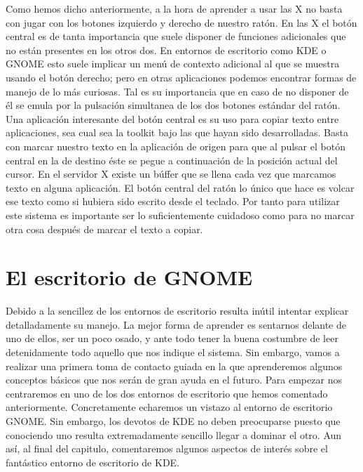 Como hemos dicho anteriormente, a la  hora de aprender a usar las {\sf
X} no basta  con jugar con los botones izquierdo  y derecho de nuestro
ratón. En  las {\sf X}  el botón central  es de tanta  importancia que
suele disponer de funciones adicionales  que no están presentes en los
otros dos. En entornos de escritorio como {\sf KDE} o {\sf GNOME} esto
suele implicar un menú de contexto  adicional al que se muestra usando
el botón derecho; pero en  otras aplicaciones podemos encontrar formas
de manejo de lo más curiosas. Tal  es su importancia que en caso de no
disponer de él se emula por la pulsación simultanea de los dos botones
estándar del ratón. Una aplicación interesante del botón central es su
uso para copiar texto entre aplicaciones, sea cual sea la toolkit bajo
las que hayan sido desarrolladas. Basta con marcar nuestro texto en la
aplicación de  origen para  que al  pulsar el botón  central en  la de
destino éste se pegue a continuación de la posición actual del cursor.
En el  servidor {\sf  X} existe un  búffer que se  llena cada  vez que
marcamos texto  en alguna  aplicación. El botón  central del  ratón lo
único que hace es volcar ese  texto como si hubiera sido escrito desde
el teclado. Por tanto para utilizar  este sistema es importante ser lo
suficientemente cuidadoso  como para  no marcar  otra cosa  después de
marcar el texto a copiar.

\section{El escritorio de GNOME}

Debido a la sencillez de los  entornos de escritorio resulta 
inútil intentar explicar  detalladamente su manejo. La  mejor forma de
aprender es  sentarnos delante de uno  de ellos, ser un  poco osado, y
ante todo tener la buena  costumbre de leer detenidamente todo aquello
que nos indique el sistema. Sin  embargo, vamos a realizar una primera
toma  de contacto  guiada  en la  que  aprenderemos algunos  conceptos
básicos que  nos serán de  gran ayuda en  el futuro. Para  empezar nos
centraremos  en  uno de  los  dos  entornos  de escritorio  que  hemos
comentado anteriormente. Concretamente echaremos un vistazo al entorno
de escritorio  {\sf GNOME}.  Sin embargo, los  devotos de
{\sf  KDE} no  deben  preocuparse puesto  que  conociendo uno  resulta
extremadamente sencillo  llegar a dominar  el otro. Aun así,  al final
del  capitulo,  comentaremos  algunos  aspectos de  interés  sobre  el
fantástico entorno de escritorio de {\sf KDE}.

